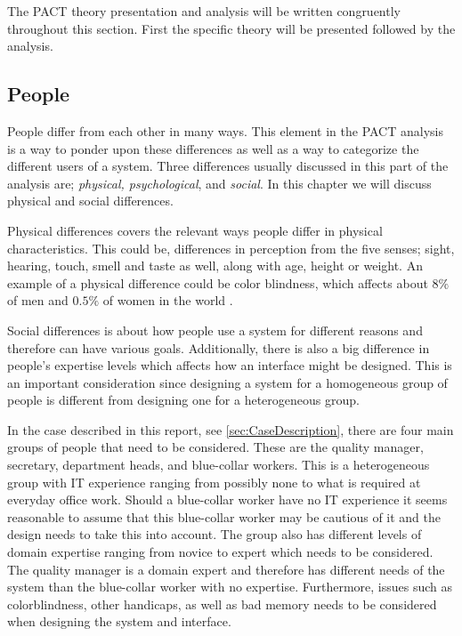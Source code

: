 The PACT theory presentation and analysis will be written congruently throughout this section.
First the specific theory will be presented followed by the analysis.

\subsection{People}\label{sec:PACT-people}
People differ from each other in many ways.
This element in the PACT analysis is a way to ponder upon these differences as well as a way to categorize the different users of a system.
Three differences usually discussed in this part of the analysis are; \textit{physical, psychological}, and \textit{social}.
In this chapter we will discuss physical and social differences.

Physical differences covers the relevant ways people differ in physical characteristics.
This could be, differences in perception from the five senses; sight, hearing, touch, smell and taste as well, along with age, height or weight.
An example of a physical difference could be color blindness, which affects about $8\%$ of men and $0.5\%$ of women in the world \cite{ColourBlind}.

Social differences is about how people use a system for different reasons and therefore can have various goals.
Additionally, there is also a big difference in people's expertise levels which affects how an interface might be designed.
This is an important consideration since designing a system for a homogeneous group of people is  different from designing one for a heterogeneous group.

In the case described in this report, see \cref{sec:CaseDescription}, there are four main groups of people that need to be considered.
These are the quality manager, secretary, department heads, and blue-collar workers.
This is a heterogeneous group with IT experience ranging from possibly none to what is required at everyday office work.
Should a blue-collar worker have no IT experience it seems reasonable to assume that this blue-collar worker may be cautious of it and the design needs to take this into account.
The group also has different levels of domain expertise ranging from novice to expert which needs to be considered.
The quality manager is a domain expert and therefore has different needs of the system than the blue-collar worker with no expertise.
Furthermore, issues such as colorblindness, other handicaps, as well as bad memory needs to be considered when designing the system and interface.

